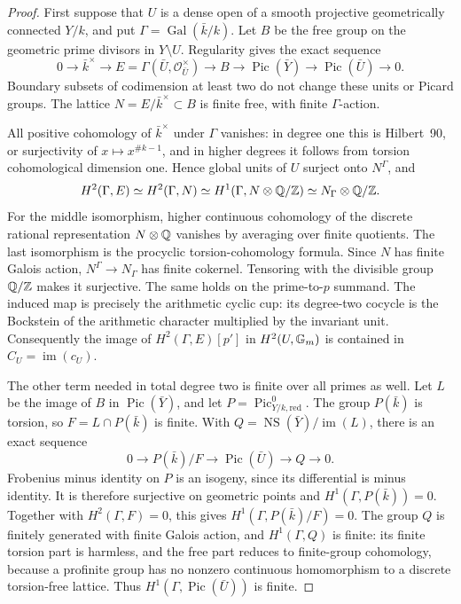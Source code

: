 \begin{proof}
First suppose that \(U\) is a dense open of a smooth projective
geometrically connected \(Y/k\), and put
\(\Gamma=\operatorname{Gal}(\bar k/k)\).  Let \(B\) be the
free group on the geometric prime divisors in \(Y\setminus U\).
Regularity gives the exact sequence
\[
 0\longrightarrow\bar k^\times
 \longrightarrow E=\Gamma(\bar U,\mathcal O_{\bar U}^\times)
 \longrightarrow B\longrightarrow\operatorname{Pic}(\bar Y)
 \longrightarrow\operatorname{Pic}(\bar U)\longrightarrow0.
\]
Boundary subsets of codimension at least two do not change these
units or Picard groups.  The lattice
\(N=E/\bar k^\times\subset B\) is finite free, with finite
\(\Gamma\)-action.

All positive cohomology of \(\bar k^\times\) under
\(\Gamma\) vanishes: in degree one this is Hilbert~90, or
surjectivity of \(x\mapsto x^{\#k-1}\), and in higher degrees
it follows from torsion cohomological dimension one.  Hence
global units of \(U\) surject onto \(N^\Gamma\), and
\[
 H^2(\Gamma,E)\simeq H^2(\Gamma,N)
 \simeq H^1(\Gamma,N\otimes\mathbb Q/\mathbb Z)
 \simeq N_\Gamma\otimes\mathbb Q/\mathbb Z.
\]
For the middle isomorphism, higher continuous cohomology of the
discrete rational representation \(N\otimes\mathbb Q\) vanishes by
averaging over finite quotients.  The last isomorphism is the
procyclic torsion-cohomology formula.  Since \(N\) has finite
Galois action, \(N^\Gamma\to N_\Gamma\) has finite cokernel.
Tensoring with the divisible group \(\mathbb Q/\mathbb Z\) makes it
surjective.  The same holds on the prime-to-\(p\) summand.
The induced map is precisely the arithmetic cyclic cup: its
degree-two cocycle is the Bockstein of the arithmetic character
multiplied by the invariant unit.  Consequently the image of
\(H^2(\Gamma,E)[p']\) in \(H^2(U,{\mathbb G_m})\) is contained
in \(C_U=\operatorname{im}(c_U)\).

The other term needed in total degree two is finite over all
primes as well.  Let \(L\) be the image of \(B\) in
\(\operatorname{Pic}(\bar Y)\), and let
\(P=\operatorname{Pic}^0_{Y/k,\mathrm{red}}\).
The group \(P(\bar k)\) is torsion, so
\(F=L\cap P(\bar k)\) is finite.  With
\(Q=\operatorname{NS}(\bar Y)/\operatorname{im}(L)\),
there is an exact sequence
\[
 0\longrightarrow P(\bar k)/F
 \longrightarrow\operatorname{Pic}(\bar U)
 \longrightarrow Q\longrightarrow0.
\]
Frobenius minus identity on \(P\) is an isogeny, since its
differential is minus identity.  It is therefore surjective
on geometric points and \(H^1(\Gamma,P(\bar k))=0\).
Together with \(H^2(\Gamma,F)=0\), this gives
\(H^1(\Gamma,P(\bar k)/F)=0\).  The group \(Q\) is
finitely generated with finite Galois action, and
\(H^1(\Gamma,Q)\) is finite: its finite torsion part is
harmless, and the free part reduces to finite-group cohomology,
because a profinite group has no nonzero continuous homomorphism
to a discrete torsion-free lattice.  Thus
\(H^1(\Gamma,\operatorname{Pic}(\bar U))\) is finite.


\end{proof}
